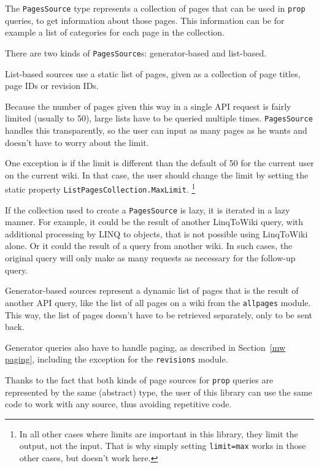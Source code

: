 The \lstinline{PagesSource} type represents a collection of pages that can be used in \texttt{prop} queries,
to get information about those pages.
This information can be for example a list of categories for each page in the collection.

There are two kinds of \lstinline{PagesSource}s: generator-based and list-based.

\medskip

List-based sources use a static list of pages, given as a collection of page titles, page IDs or revision IDs.

Because the number of pages given this way in a single API request is fairly limited (usually to 50),
large lists have to be queried multiple times.
\lstinline{PagesSource} handles this transparently, so the user can input as many pages as he wants and doesn't have to worry about the limit.

One exception is if the limit is different than the default of 50 for the current user on the current wiki.
In that case, the user should change the limit by setting the static property \lstinline{ListPagesCollection.MaxLimit}.%
\footnote{In all other cases where limits are important in this library, they limit the output, not the input.
That is why simply setting \texttt{limit=max} works in those other cases, but doesn't work here.}

If the collection used to create a \lstinline{PagesSource} is lazy, it is iterated in a lazy manner.
For example, it could be the result of another LinqToWiki query, with additional processing by LINQ to objects,
that is not possible using LinqToWiki alone.
Or it could the result of a query from another wiki.
In such cases, the original query will only make as many requests as necessary for the follow-up query.

\medskip

Generator-based sources represent a dynamic list of pages that is the result of another API query,
like the list of all pages on a wiki from the \texttt{allpages} module.
This way, the list of pages doesn't have to be retrieved separately, only to be sent back.

Generator queries also have to handle paging, as described in Section~\ref{mw paging},
including the exception for the \texttt{revisions} module.

\medskip

Thanks to the fact that both kinds of page sources for \texttt{prop} queries are represented by the same
(abstract) type, the user of this library can use the same code to work with any source,
thus avoiding repetitive code.


